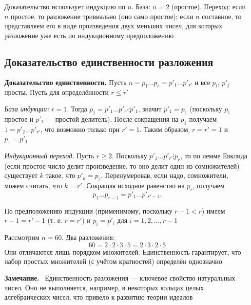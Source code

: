 \documentclass[a4paper,12pt]{article}
\newcommand{\myremark}{\textbf{Замечание.}\ }
\theoremstyle{definition}
\theoremstyle{plain}
\theoremstyle{remark}
\begin{document}
	\begin{tcolorbox}[colback=green!5, colframe=green!50!black, title=Пояснение]
	Доказательство использует индукцию по $n$. База: $n=2$ (простое). Переход: если $n$ простое, то разложение тривиально (оно само простое); если $n$ составное, то представляем его в виде произведения двух меньших чисел, для которых разложение уже есть по индукционному предположению
	\end{tcolorbox}
	
	\subsection{Доказательство единственности разложения}
	
	\noindent \textbf{Доказательство единственности.}
	Пусть $n = p_1 \dots p_r = p'_1 \dots p'_{r'}$ и все $p_i$, $p'_j$ просты. Пусть для определённости $r \leq r'$
	
	\textit{База индукции:} $r = 1$. Тогда $p_1 = p'_1 \dots p'_{r'} \vdots p'_1$, значит $p'_1 = p_1$ (поскольку $p_1$ простое и $p'_1$ — простой делитель). После сокращения на $p_1$ получаем $1 = p'_2 \dots p'_{r'}$, что возможно только при $r' = 1$. Таким образом, $r = r' = 1$ и $p_1 = p'_1$
	
	\textit{Индукционный переход.} Пусть $r \geq 2$. Поскольку $p'_1 \dots p'_{r'} \vdots p_r$, то по лемме Евклида (если простое число делит произведение, то оно делит один из сомножителей) существует $k$ такое, что $p'_k = p_r$. Перенумеровав, если надо, сомножители, можем считать, что $k = r'$. Сокращая исходное равенство на $p_r$, получаем
	\[
	p_1 \dots p_{r-1} = p'_1 \dots p'_{r'-1}.
	\]
	
	По предположению индукции (применимому, поскольку $r-1 < r$) имеем $r-1 = r'-1$ (т. е. $r = r'$) и $p_i = p'_i$ для $i = 1, 2, \dots, r-1$
	
	\begin{tcolorbox}[colback=blue!5, colframe=blue!40!black, title=Иллюстрация единственности]
	Рассмотрим $n = 60$. Два разложения:
	\[
	60 = 2 \cdot 2 \cdot 3 \cdot 5 = 2 \cdot 3 \cdot 2 \cdot 5
	\]
	Они отличаются лишь порядком множителей. Единственность гарантирует, что набор простых множителей (с учётом кратностей) определён однозначно
	\end{tcolorbox}
	
	\myremark
	Единственность разложения — ключевое свойство натуральных чисел. Оно не выполняется, например, в некоторых кольцах целых алгебраических чисел, что привело к развитию теории идеалов
	
\end{document}

